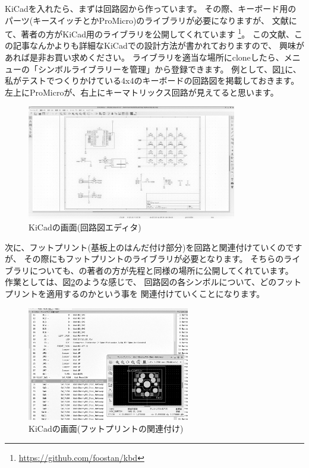 \documentclass[mingoth,a4paper]{jsarticle}
\begin{document}
KiCadを入れたら、まずは回路図から作っています。
その際、キーボード用のパーツ(キースイッチとかProMicro)のライブラリが必要になりますが、
文献\cite{foostan01}にて、著者の方がKiCad用のライブラリを公開してくれています%
\footnote{\url{https://github.com/foostan/kbd}}。
この文献、この記事なんかよりも詳細なKiCadでの設計方法が書かれておりますので、
興味があれば是非お買い求めください。
ライブラリを適当な場所にcloneしたら、メニューの「シンボルライブラリーを管理」から登録できます。
例として、図\ref{fig:kicad-schematic}に、私がテストでつくりかけている4x4のキーボードの回路図を掲載しておきます。
左上にProMicroが、右上にキーマトリックス回路が見えてると思います。

\begin{figure}[htbp]
 \begin{center}
  \includegraphics[keepaspectratio,height=5cm]{./image201911-kansai-02/kicad-schematic.png}
 \end{center}
 \vspace*{-1zw}
 \caption{KiCadの画面(回路図エディタ)}
 \label{fig:kicad-schematic}
\end{figure}

次に、フットプリント(基板上のはんだ付け部分)を回路と関連付けていくのですが、
その際にもフットプリントのライブラリが必要となります。
そちらのライブラリについても、\cite{foostan01}の著者の方が先程と同様の場所に公開してくれています。
作業としては、図\ref{fig:kicad-footprint}のような感じで、
回路図の各シンボルについて、どのフットプリントを適用するのかという事を
関連付けていくことになります。

\begin{figure}[htbp]
 \begin{center}
  \includegraphics[keepaspectratio,height=5cm]{./image201911-kansai-02/kicad-footprint.png}
 \end{center}
 \vspace*{-1zw}
 \caption{KiCadの画面(フットプリントの関連付け)}
 \label{fig:kicad-footprint}
\end{figure}
\end{document}
